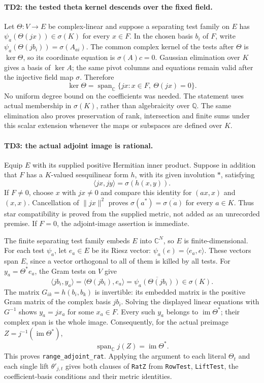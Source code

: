 \paragraph{TD2: the tested theta kernel descends over the fixed field.}
Let $\Theta:V\to E$ be complex-linear and suppose a separating test
family on $E$ has
$\psi_a(\Theta(jx))\in\sigma(K)$ for every $x\in F$.
In the chosen basis $b_i$ of $F$, write
$\psi_a(\Theta(jb_i))=\sigma(A_{ai})$. The common complex kernel of
the tests after $\Theta$ is $\ker\Theta$, so its coordinate equation is
$\sigma(A)c=0$. Gaussian elimination over $K$ gives a basis of
$\ker A$; the same pivot columns and equations remain valid after the
injective field map $\sigma$. Therefore
\[
 \ker\Theta
 =\operatorname{span}_{\mathbb C}
   \{jx:x\in F,\ \Theta(jx)=0\}.
\]
No uniform degree bound on the coefficients was needed. The statement
uses actual membership in $\sigma(K)$, rather than algebraicity over
$\mathbb Q$. The same elimination also proves preservation of rank,
intersection and finite sums under this scalar extension whenever the
maps or subspaces are defined over $K$.

\paragraph{TD3: the actual adjoint image is rational.}
Equip $E$ with its supplied positive Hermitian inner product.
Suppose in addition that $F$ has a $K$-valued sesquilinear form $h$,
with its given involution $*$, satisfying
\[
 \langle jx,jy\rangle=\sigma(h(x,y)).
\]
If $F\ne0$, choose $x$ with $jx\ne0$ and compare this identity for
$(ax,x)$ and $(x,x)$. Cancellation of $\|jx\|^2$ proves
$\sigma(a^*)=\overline{\sigma(a)}$ for every $a\in K$.
Thus star compatibility is proved from the supplied metric, not added as
an unrecorded premise. If $F=0$, the adjoint-image assertion is immediate.

The finite separating test family embeds $E$ into $\mathbb C^N$, so
$E$ is finite-dimensional. For each test $\psi_a$, let $e_a\in E$ be its Riesz vector:
$\psi_a(e)=\langle e_a,e\rangle$. These vectors span $E$, since a
vector orthogonal to all of them is killed by all tests. For
$y_a=\Theta^*e_a$, the Gram tests on $V$ give
\[
 \langle jb_i,y_a\rangle
 =\langle\Theta(jb_i),e_a\rangle
 =\overline{\psi_a(\Theta(jb_i))}\in\sigma(K).
\]
The matrix $G_{ik}=h(b_i,b_k)$ is invertible: its embedded matrix is the
positive Gram matrix of the complex basis $jb_i$. Solving the displayed
linear equations with $G^{-1}$ shows $y_a=jx_a$ for some $x_a\in F$.
Every such $y_a$ belongs to $\operatorname{im}\Theta^*$; their complex
span is the whole image. Consequently, for the actual preimage
$Z=j^{-1}(\operatorname{im}\Theta^*)$,
\[
 \operatorname{span}_{\mathbb C}j(Z)=\operatorname{im}\Theta^*.
 \tag{TD.1}
\]
This proves \texttt{range\_adjoint\_rat}. Applying the argument to each
literal $\Theta_t$ and each single lift $\theta'_{j,t}$ gives both
clauses of \texttt{RatZ} from \texttt{RowTest}, \texttt{LiftTest},
the coefficient-basis conditions and their metric identities.

